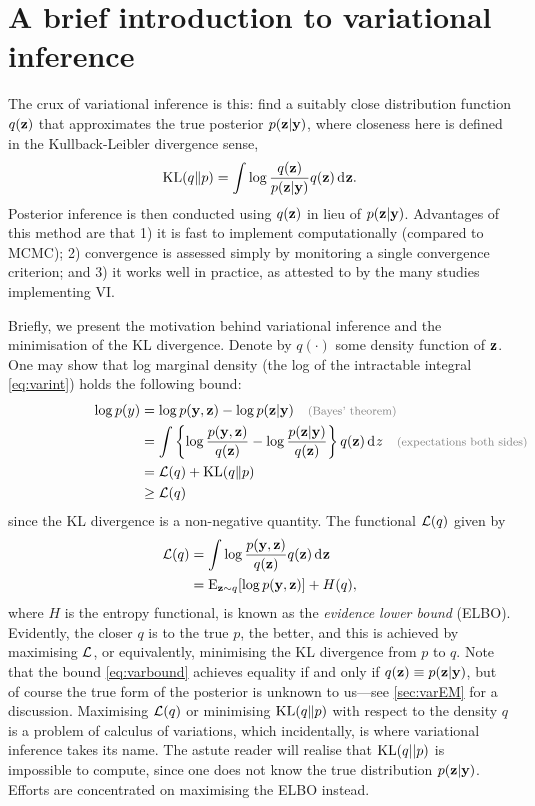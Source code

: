 \section{A brief introduction to variational inference}
\label{sec:varintro}






The crux of variational inference is this: find a suitably close distribution function $q({\mathbf z})$ that approximates the true posterior $p({\mathbf z}|{\mathbf y})$, where closeness here is defined in the Kullback-Leibler divergence sense,
\[
  \operatorname{KL}(q\Vert p) = \int \log \frac{q({\mathbf z})}{p({\mathbf z}|{\mathbf y})} q({\mathbf z}) \operatorname{d}\hspace{0.5pt}\! {\mathbf z}.
\]
Posterior inference is then conducted using $q({\mathbf z})$ in lieu of $p({\mathbf z}|{\mathbf y})$.
Advantages of this method are that 1) it is fast to implement computationally (compared to MCMC); 2) convergence is assessed simply by monitoring a single convergence criterion; and 3) it works well in practice, as attested to by the many studies implementing VI.

Briefly, we present the motivation behind variational inference and the minimisation of the KL divergence.
Denote by $q(\cdot)$ some density function of ${\mathbf z}$.
One may show that log marginal density (the log of the intractable integral \cref{eq:varint}) holds the following bound:
\begin{align}
  \log p(y) &= \log p(\by,\bz) - \log p(\bz|\by) \mycomment{\footnotesize (Bayes' theorem)} \nonumber \\
  &= \int \left\{ \log \frac{p(\by,\bz)}{q(\bz)} - \log \frac{p(\bz|\by)}{q(\bz)} \right\} q(\bz) \dint z \mycomment{\footnotesize (expectations both sides)} \hspace{0.7cm} \nonumber \\    
  &=  \cL(q) +  \KL(q \Vert p) \nonumber \\
  &\geq \cL(q) \label{eq:varbound}
\end{align}
since the KL divergence is a non-negative quantity.
The functional ${\mathcal L}(q)$ given by 
\begin{align}
  {\mathcal L}(q) 
  &= \int \log \frac{p({\mathbf y},{\mathbf z})}{q({\mathbf z})} q({\mathbf z}) \operatorname{d}\hspace{0.5pt}\! {\mathbf z} \nonumber \\
  &= \operatorname{E}_{{\mathbf z}\sim q}[\log p({\mathbf y},{\mathbf z})] + H(q), \label{eq:elbo1}
\end{align}
where $H$ is the entropy functional, is known as the \emph{evidence lower bound} (ELBO).
Evidently, the closer $q$ is to the true $p$, the better, and this is achieved by maximising ${\mathcal L}$, or equivalently, minimising the KL divergence from $p$ to $q$.
Note that the bound \cref{eq:varbound} achieves equality if and only if $q({\mathbf z}) \equiv p({\mathbf z}|{\mathbf y})$, but of course the true form of the posterior is unknown to us---see \cref{sec:varEM} for a discussion.
Maximising ${\mathcal L}(q)$ or minimising $\operatorname{KL}(q\Vert p)$ with respect to the density $q$ is a problem of calculus of variations, which incidentally, is where variational inference takes its name.
The astute reader will realise that $\operatorname{KL}(q||p)$ is impossible to compute, since one does not know the true distribution $p({\mathbf z}|{\mathbf y})$. Efforts are concentrated on maximising the ELBO instead.

